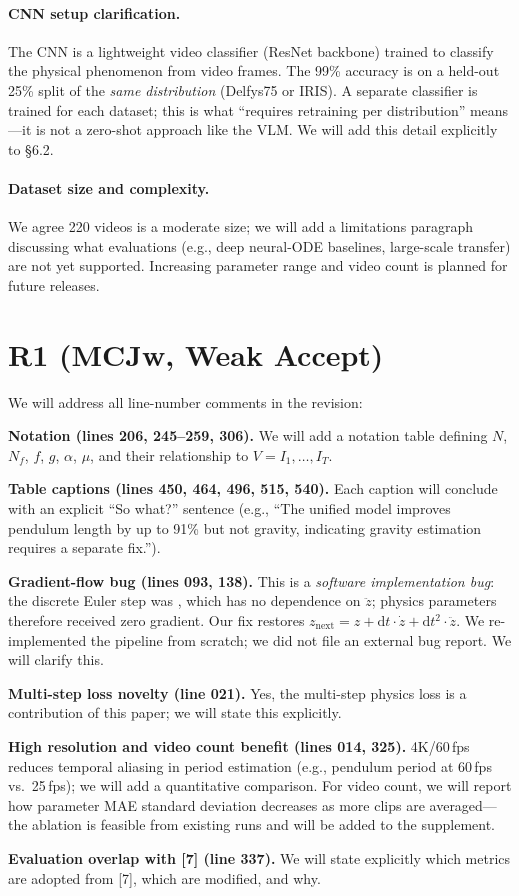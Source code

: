 \documentclass[10pt,twocolumn,letterpaper]{article}
\begin{document}
\paragraph{CNN setup clarification.}
The CNN is a lightweight video classifier (ResNet backbone) trained to classify the physical phenomenon from video frames. The 99\% accuracy is on a held-out 25\% split of the \emph{same distribution} (Delfys75 or IRIS). A separate classifier is trained for each dataset; this is what ``requires retraining per distribution'' means---it is not a zero-shot approach like the VLM. We will add this detail explicitly to \S6.2.

\paragraph{Dataset size and complexity.}
We agree 220 videos is a moderate size; we will add a limitations paragraph discussing what evaluations (e.g., deep neural-ODE baselines, large-scale transfer) are not yet supported. Increasing parameter range and video count is planned for future releases.

\section{R1 (MCJw, Weak Accept)}

We will address all line-number comments in the revision:

\textbf{Notation (lines 206, 245--259, 306).} We will add a notation table defining $N$, $N_f$, $f$, $g$, $\alpha$, $\mu$, and their relationship to $V = I_1,\ldots,I_T$.

\textbf{Table captions (lines 450, 464, 496, 515, 540).} Each caption will conclude with an explicit ``So what?'' sentence (e.g., ``The unified model improves pendulum length by up to 91\% but not gravity, indicating gravity estimation requires a separate fix.'').

\textbf{Gradient-flow bug (lines 093, 138).} This is a \emph{software implementation bug}: the discrete Euler step was , which has no dependence on $\ddot{z}$; physics parameters therefore received zero gradient. Our fix restores $z_{\text{next}} = z + \mathrm{d}t\cdot\dot{z} + \mathrm{d}t^2\cdot\ddot{z}$. We re-implemented the pipeline from scratch; we did not file an external bug report. We will clarify this.

\textbf{Multi-step loss novelty (line 021).} Yes, the multi-step physics loss is a contribution of this paper; we will state this explicitly.

\textbf{High resolution and video count benefit (lines 014, 325).} 4K/60\,fps reduces temporal aliasing in period estimation (e.g., pendulum period at 60\,fps vs.\ 25\,fps); we will add a quantitative comparison. For video count, we will report how parameter MAE standard deviation decreases as more clips are averaged---the ablation is feasible from existing runs and will be added to the supplement.

\textbf{Evaluation overlap with [7] (line 337).} We will state explicitly which metrics are adopted from [7], which are modified, and why.
\end{document}
